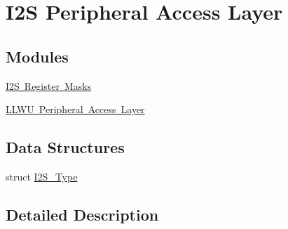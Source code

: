 \hypertarget{group___i2_s___peripheral___access___layer}{}\section{I2S Peripheral Access Layer}
\label{group___i2_s___peripheral___access___layer}
\subsection*{Modules}
\begin{DoxyCompactItemize}
\item 
\mbox{\hyperlink{group___i2_s___register___masks}{I2\+S Register Masks}}
\item 
\mbox{\hyperlink{group___l_l_w_u___peripheral___access___layer}{L\+L\+W\+U Peripheral Access Layer}}
\end{DoxyCompactItemize}
\subsection*{Data Structures}
\begin{DoxyCompactItemize}
\item 
struct \mbox{\hyperlink{struct_i2_s___type}{I2\+S\+\_\+\+Type}}
\end{DoxyCompactItemize}


\subsection{Detailed Description}
